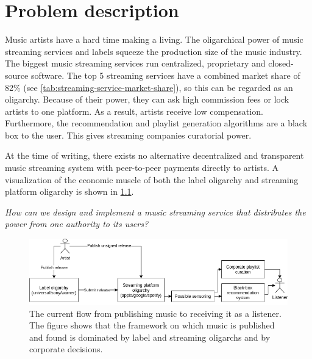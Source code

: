 \chapter{\label{chap:related-work}Problem description}
Music artists have a hard time making a living. The oligarchical power of music streaming services and labels squeeze the production size of the music industry. The biggest music streaming services run centralized, proprietary and closed-source software. The top 5 streaming services have a combined market share of 82\% (see \ref{tab:streaming-service-market-share}), so this can be regarded as an oligarchy. Because of their power, they can ask high commission fees or lock artists to one platform. As a result, artists receive low compensation. Furthermore, the recommendation and playlist generation algorithms are a black box to the user. This gives streaming companies curatorial power. 

At the time of writing, there exists no alternative decentralized and transparent music streaming system with peer-to-peer payments directly to artists. A visualization of the economic muscle of both the label oligarchy and streaming platform oligarchy is shown in \ref{fig:current-music-publishing-situation}.

\textit{How can we design and implement a music streaming service that distributes the power from one authority to its users?}%
\begin{figure}
    \centering
    \includegraphics[width=1\linewidth]{problem-description/current-music-publishing-situation.png}
    \caption{The current flow from publishing music to receiving it as a listener. The figure shows that the framework on which music is published and found is dominated by label and streaming oligarchs and by corporate decisions.}
    \label{fig:current-music-publishing-situation}
\end{figure}

